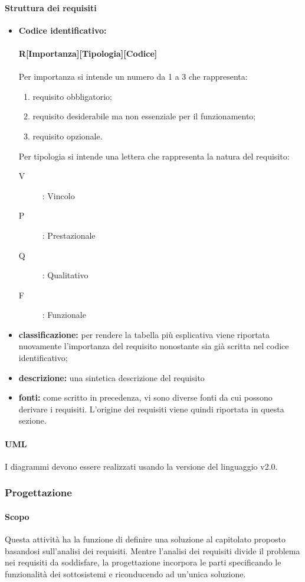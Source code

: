 \paragraph{Struttura dei requisiti} \label{para:requisiti}
\begin{itemize}
\item \textbf{Codice identificativo:} \\ \\
 		\textbf{R[Importanza][Tipologia][Codice]}\\ \\
Per importanza si intende un numero da 1 a 3 che rappresenta:
\begin{enumerate}
\item requisito obbligatorio;
\item requisito desiderabile ma non essenziale per il funzionamento;
\item requisito opzionale.
\end{enumerate}
Per tipologia si intende una lettera che rappresenta la natura del requisito:
\begin{description}
\item[V]: Vincolo
\item[P]: Prestazionale
\item[Q]: Qualitativo
\item[F]: Funzionale
\end{description}
\item \textbf{classificazione:} per rendere la tabella più esplicativa viene riportata nuovamente l'importanza del requisito nonostante sia già scritta nel codice identificativo;
\item \textbf{descrizione:} una sintetica descrizione del requisito
\item \textbf{fonti:} come scritto in precedenza, vi sono diverse fonti da cui possono derivare i requisiti. L'origine dei requisiti viene quindi riportata in questa sezione. 
\end{itemize}
\paragraph{UML}
I diagrammi  devono essere realizzati usando la versione del linguaggio v2.0.
\subsubsection{Progettazione}
\paragraph{Scopo}
Questa attività ha la funzione di definire una soluzione al capitolato proposto basandosi sull'analisi dei requisiti.
Mentre l'analisi dei requisiti divide il problema nei requisiti da soddisfare, la progettazione incorpora le parti specificando le funzionalità dei sottosistemi e riconducendo ad un'unica soluzione.
